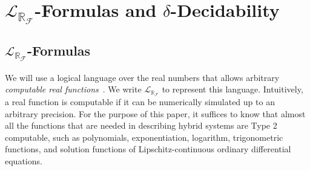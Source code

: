\documentclass[12pt]{article}
\theoremstyle{plain}
\theoremstyle{definition}
\newcommand{\lrf}{\mathcal{L}_{\mathbb{R}_{\mathcal{F}}}}
\begin{document}
\section{$\lrf$-Formulas and $\delta$-Decidability}

\subsection{$\lrf$-Formulas}
We will use a logical language over the real numbers that allows arbitrary {\em computable real functions}~\cite{CAbook}. We write $\lrf$ to represent this language. Intuitively, a real function is computable if it can be numerically simulated up to an arbitrary precision. For the purpose of this paper, it suffices to know that almost all the functions that are needed in describing hybrid systems are Type 2 computable, such as polynomials, exponentiation, logarithm, trigonometric functions, and solution functions of Lipschitz-continuous ordinary differential equations.
\end{document}
